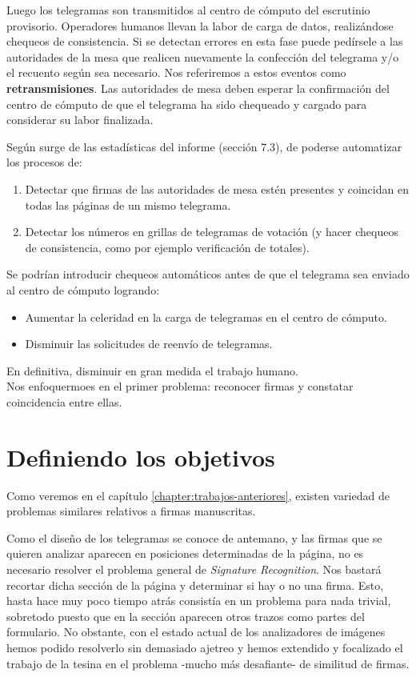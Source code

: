 Luego los telegramas son transmitidos al centro de cómputo del escrutinio provisorio. Operadores humanos llevan la labor de carga de datos, realizándose chequeos de consistencia. Si se detectan errores en esta fase puede pedírsele a las autoridades de la mesa que realicen nuevamente la confección del telegrama y/o  el recuento según sea necesario. Nos referiremos a estos eventos como \textbf{retransmisiones}. Las autoridades de mesa deben esperar la confirmación del centro de cómputo de que el telegrama ha sido chequeado y cargado para considerar su labor finalizada.


Según surge de las estadísticas del informe \cite{unr-informe} (sección 7.3), de poderse automatizar los procesos de:
\begin{enumerate}
    \item Detectar que firmas de las autoridades de mesa estén presentes y coincidan en todas las páginas de un mismo telegrama.
    \item Detectar los números en grillas de telegramas de votación (y hacer chequeos de consistencia, como por ejemplo verificación de totales).
\end{enumerate}
Se podrían introducir chequeos automáticos antes de que el telegrama sea enviado al centro de cómputo logrando:
\begin{itemize}
    \item  Aumentar la celeridad en la carga de telegramas en el centro de cómputo.
    \item Disminuir las solicitudes de reenvío de telegramas.
\end{itemize}
En definitiva, disminuir en gran medida el trabajo humano.\\

Nos enfoquermoes en el primer problema: reconocer firmas y constatar coincidencia entre ellas.

\section{Definiendo los objetivos}
\label{section:objectives}

Como veremos en el capítulo \ref{chapter:trabajos-anteriores}, existen variedad de problemas similares relativos a firmas manuscritas.

Como el diseño de los telegramas se conoce de antemano, y las firmas que se quieren analizar aparecen en posiciones determinadas de la página, no es necesario resolver el problema general de \textit{Signature Recognition}. Nos bastará recortar dicha sección de la página y determinar si hay o no una firma. Esto, hasta hace muy poco tiempo atrás consistía en un problema para nada trivial, sobretodo puesto que en la sección aparecen otros trazos como partes del formulario. No obstante, con el estado actual de los analizadores de imágenes hemos podido resolverlo sin demasiado ajetreo y hemos extendido y focalizado el trabajo de la tesina en el problema -mucho más desafiante- de similitud de firmas.\\

